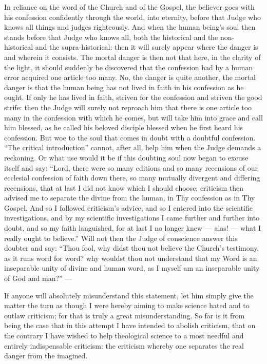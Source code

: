 \documentclass[12pt,a4paper]{book}
\begin{document}
In reliance on the word of the Church and of the Gospel, the believer goes with
his confession confidently through the world, into eternity, before that Judge
who knows all things and judges righteously. And when the human being's soul
then stands before that Judge who knows all, both the historical and the
non-historical and the supra-historical: then it will surely appear where the
danger is and wherein it consists. The mortal danger is then not that here, in
the clarity of the light, it should suddenly be discovered that the confession
had by a human error acquired one article too many. No, the danger is quite
another, the mortal danger is that the human being has not lived in faith in his
confession as he ought. If only he has lived in faith, striven for the
confession and striven the good strife: then the Judge will surely not reproach
him that there is one article too many in the confession with which he comes,
but will take him into grace and call him blessed, as he called his beloved
disciple blessed when he first heard his confession. But woe to the soul that
comes in doubt with a doubtful confession. ``The critical introduction'' cannot,
after all, help him when the Judge demands a reckoning. Or what use would it be
if this
doubting soul now began to excuse itself and say: ``Lord, there were so many
editions and so many recensions of our ecclesial confession of faith down there,
so many mutually divergent and differing recensions, that at last I did not know
which I should choose; criticism then advised me to separate the divine from the
human, in Thy confession as in Thy Gospel. And so I followed criticism's advice,
and so I entered into the scientific investigations, and by my scientific
investigations I came further and further into doubt, and so my faith languished,
for at last I no longer knew --- alas! --- what I really ought to believe.'' Will
not then the Judge of conscience answer this doubter and say: ``Thou fool, why
didst thou not believe the Church's testimony, as it runs word for word? why
wouldst thou not understand that my Word is an inseparable unity of divine and
human word, as I myself am an inseparable unity of God and man?'' ---

If anyone will absolutely misunderstand this statement, let him simply give the
matter the turn as though I were hereby aiming to make science hated and to
outlaw criticism; for that is truly a great misunderstanding. So far is it from
being the case that in this attempt I have intended to abolish criticism, that
on the contrary I have wished to help theological science to a most needful and
entirely indispensable criticism: the criticism whereby one separates the real
danger from the imagined.
\end{document}
